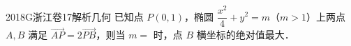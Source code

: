 
\begin{problem}{2018}{G}{浙江卷}{17}{解析几何}
已知点 $ P(0,1) $，椭圆 $ \dfrac{x^2}{4}+y^2=m $（$ m>1 $）上两点 $ A,B $ 满足 $ \overrightarrow{AP}=2\overrightarrow{PB} $，则当 $ m= $ \underline{\hspace{4em}} 时，点 $ B $ 横坐标的绝对值最大．
\end{problem}

\begin{answer}

\end{answer}

\begin{solutions}

\end{solutions}